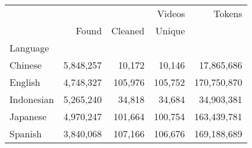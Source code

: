 \begin{tabular}{lrrrr}
\toprule
 & \multicolumn{3}{r}{Videos} & Tokens \\
 & Found & Cleaned & Unique &  \\
Language &  &  &  &  \\
\midrule
Chinese & 5,848,257 & 10,172 & 10,146 & 17,865,686 \\
English & 4,748,327 & 105,976 & 105,752 & 170,750,870 \\
Indonesian & 5,265,240 & 34,818 & 34,684 & 34,903,381 \\
Japanese & 4,970,247 & 101,664 & 100,754 & 163,439,781 \\
Spanish & 3,840,068 & 107,166 & 106,676 & 169,188,689 \\
\bottomrule
\end{tabular}
